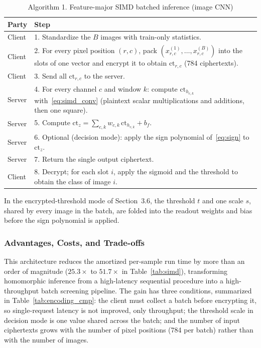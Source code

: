\documentclass[conference]{IEEEtran}
\begin{document}
\begin{table}[t]
\caption*{Algorithm 1. Feature-major SIMD batched inference (image CNN)}
\label{tab:alg1}
\centering
\footnotesize
\begin{tabular}{L{1.1cm} L{6.7cm}}
\toprule
\textbf{Party} & \textbf{Step} \\
\midrule
Client & 1. Standardize the $B$ images with train-only statistics. \\
Client & 2. For every pixel position $(r, c)$, pack $(x^{(1)}_{r,c}, \ldots, x^{(B)}_{r,c})$ into the slots of one vector and encrypt it to obtain $\mathrm{ct}_{r,c}$ (784 ciphertexts). \\
Client & 3. Send all $\mathrm{ct}_{r,c}$ to the server. \\
Server & 4. For every channel $c$ and window $k$: compute $\mathrm{ct}_{h_{c,k}}$ with~\eqref{eq:simd_conv} (plaintext scalar multiplications and additions, then one square). \\
Server & 5. Compute $\mathrm{ct}_z = \sum_{c,k} w_{c,k}\,\mathrm{ct}_{h_{c,k}} + b_f$. \\
Server & 6. Optional (decision mode): apply the sign polynomial of~\eqref{eq:sign} to $\mathrm{ct}_z$. \\
Server & 7. Return the single output ciphertext. \\
Client & 8. Decrypt; for each slot $i$, apply the sigmoid and the threshold to obtain the class of image $i$. \\
\bottomrule
\end{tabular}
\end{table}

In the encrypted-threshold mode of Section~3.6, the threshold $t$ and one scale $s$, shared by every image in the batch, are folded into the readout weights and bias before the sign polynomial is applied.

\subsubsection{Advantages, Costs, and Trade-offs}
This architecture reduces the amortized per-sample run time by more than an order of magnitude ($25.3\times$ to $51.7\times$ in Table~\ref{tab:simd}), transforming homomorphic inference from a high-latency sequential procedure into a high-throughput batch screening pipeline. The gain has three conditions, summarized in Table~\ref{tab:encoding_cmp}: the client must collect a batch before encrypting it, so single-request latency is not improved, only throughput; the threshold scale in decision mode is one value shared across the batch; and the number of input ciphertexts grows with the number of pixel positions (784 per batch) rather than with the number of images.
\end{document}
